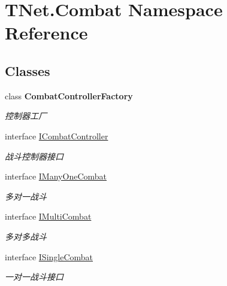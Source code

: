 \hypertarget{namespace_t_net_1_1_combat}{}\section{T\+Net.\+Combat Namespace Reference}
\label{namespace_t_net_1_1_combat}
\subsection*{Classes}
\begin{DoxyCompactItemize}
\item 
class {\bfseries Combat\+Controller\+Factory}
\begin{DoxyCompactList}\small\item\em 控制器工厂 \end{DoxyCompactList}\item 
interface \mbox{\hyperlink{interface_t_net_1_1_combat_1_1_i_combat_controller}{I\+Combat\+Controller}}
\begin{DoxyCompactList}\small\item\em 战斗控制器接口 \end{DoxyCompactList}\item 
interface \mbox{\hyperlink{interface_t_net_1_1_combat_1_1_i_many_one_combat}{I\+Many\+One\+Combat}}
\begin{DoxyCompactList}\small\item\em 多对一战斗 \end{DoxyCompactList}\item 
interface \mbox{\hyperlink{interface_t_net_1_1_combat_1_1_i_multi_combat}{I\+Multi\+Combat}}
\begin{DoxyCompactList}\small\item\em 多对多战斗 \end{DoxyCompactList}\item 
interface \mbox{\hyperlink{interface_t_net_1_1_combat_1_1_i_single_combat}{I\+Single\+Combat}}
\begin{DoxyCompactList}\small\item\em 一对一战斗接口 \end{DoxyCompactList}\end{DoxyCompactItemize}
